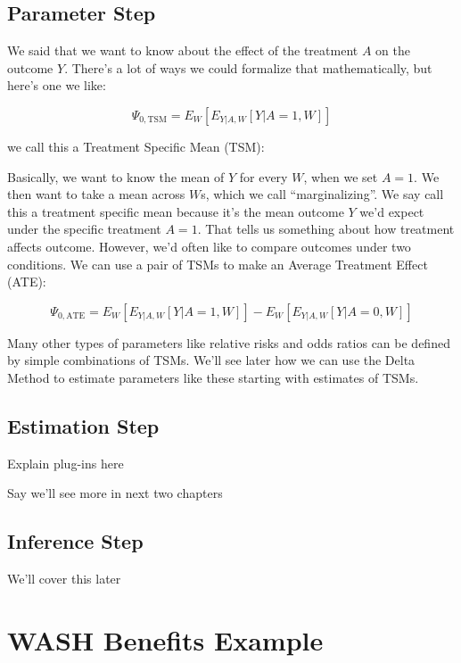\documentclass[
  12pt, krantz2,
]{krantz}
\theoremstyle{definition}
\theoremstyle{definition}
\theoremstyle{definition}
\newcommand{\1}{\mathbbm{1}}
\begin{document}
\hypertarget{parameter-step}{%
\subsection{Parameter Step}\label{parameter-step}}

We said that we want to know about the effect of the treatment \(A\) on the outcome \(Y\). There's a lot of ways we could formalize that mathematically, but here's one we like:

\[\Psi_{0,\text{TSM}}=E_W[E_{Y|A,W}[Y|A=1,W]]\]

we call this a Treatment Specific Mean (TSM):

Basically, we want to know the mean of \(Y\) for every \(W\), when we set \(A=1\). We then want to take a mean across \(W\)s, which we call ``marginalizing''. We say call this a treatment specific mean because it's the mean outcome \(Y\) we'd expect under the specific treatment \(A=1\). That tells us something about how treatment affects outcome. However, we'd often like to compare outcomes under two conditions. We can use a pair of TSMs to make an Average Treatment Effect (ATE):

\[\Psi_{0,\text{ATE}}=E_W[E_{Y|A,W}[Y|A=1,W]]- E_W[E_{Y|A,W}[Y|A=0,W]]\]

Many other types of parameters like relative risks and odds ratios can be defined by simple combinations of TSMs. We'll see later how we can use the Delta Method to estimate parameters like these starting with estimates of TSMs.

\hypertarget{estimation-step}{%
\subsection{Estimation Step}\label{estimation-step}}

Explain plug-ins here

Say we'll see more in next two chapters

\hypertarget{inference-step}{%
\subsection{Inference Step}\label{inference-step}}

We'll cover this later

\hypertarget{wash-benefits-example}{%
\section{WASH Benefits Example}\label{wash-benefits-example}}
\end{document}
